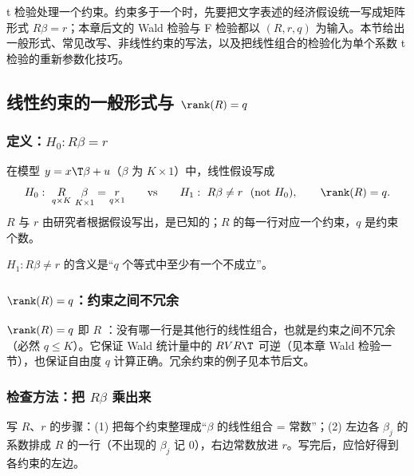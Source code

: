 t 检验处理一个约束。约束多于一个时，先要把文字表述的经济假设统一写成矩阵形式 $R\beta=r$；本章后文的 Wald 检验与 F 检验都以 $(R,r,q)$ 为输入。本节给出一般形式、常见改写、非线性约束的写法，以及把线性组合的检验化为单个系数 t 检验的重新参数化技巧。

\subsection{线性约束的一般形式与 \texorpdfstring{$\rank(R)=q$}{rank(R) = q}}

\subsubsection{定义：\texorpdfstring{$H_0:R\beta=r$}{H0: R beta = r}}

\begin{defn}[线性假设]\label{def:U06a-Rbr}
在模型 $y=x\T\beta+u$（$\beta$ 为 $K\times1$）中，线性假设写成
\[
H_0:\ \underset{q\times K}{R}\ \underset{K\times1}{\beta}=\underset{q\times1}{r}
\qquad\text{vs}\qquad
H_1:\ R\beta\ne r\ \ (\text{not }H_0),\qquad \rank(R)=q .
\]
$R$ 与 $r$ 由研究者根据假设写出，是已知的；$R$ 的每一行对应一个约束，$q$ 是约束个数。
\end{defn}

$H_1:R\beta\ne r$ 的含义是“$q$ 个等式中至少有一个不成立”。

\subsubsection{\texorpdfstring{$\rank(R)=q$}{rank(R) = q}：约束之间不冗余}

$\rank(R)=q$ 即 $R$ ：没有哪一行是其他行的线性组合，也就是约束之间不冗余（必然 $q\le K$）。它保证 Wald 统计量中的 $RVR\T$ 可逆（见本章 Wald 检验一节），也保证自由度 $q$ 计算正确。冗余约束的例子见本节后文。

\subsubsection{检查方法：把 \texorpdfstring{$R\beta$}{R beta} 乘出来}

写 $R$、$r$ 的步骤：(1) 把每个约束整理成“$\beta$ 的线性组合 = 常数”；(2) 左边各 $\beta_j$ 的系数排成 $R$ 的一行（不出现的 $\beta_j$ 记 0），右边常数放进 $r$。写完后，应恰好得到各约束的左边。

